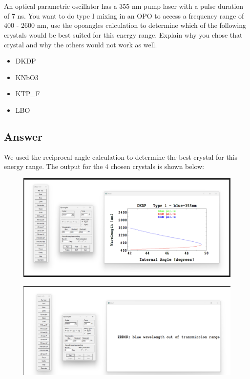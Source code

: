 \documentclass[12pt]{article}
\begin{document}
\section{}
An optical parametric oscillator has a 355 nm pump laser with a pulse duration of 7 ns. You want to do type I mixing in an OPO to access a frequency range of 400 - 2600 nm, use the opoangles calculation to determine which of the following crystals would be best suited for this energy range. Explain why you chose that crystal and why the others would not work as well.
\begin{itemize}
\item DKDP
\item KNbO3
\item KTP\_F
\item LBO
\end{itemize}
\subsection{Answer}
We used the reciprocal angle calculation to determine the best crystal for this energy range. The output for the 4 chosen crystals is shown below:
\newpage
\begin{figure}
\includegraphics[width=\textwidth]{2.png}
\end{figure}
\begin{figure}
\includegraphics[width=\textwidth]{3.png}
\end{figure}
\end{document}
